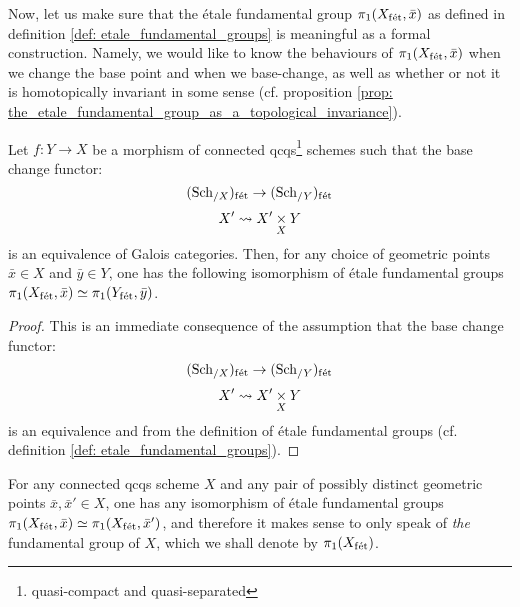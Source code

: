         Now, let us make sure that the \'etale fundamental group $\pi_1(X_{\mathrm{f\acute{e}t}}, \bar{x})$ as defined in definition \ref{def: etale_fundamental_groups} is meaningful as a formal construction. Namely, we would like to know the behaviours of $\pi_1(X_{\mathrm{f\acute{e}t}}, \bar{x})$ when we change the base point and when we base-change, as well as whether or not it is homotopically invariant in some sense (cf. proposition \ref{prop: the_etale_fundamental_group_as_a_topological_invariance}). 
        \begin{proposition} \label{prop: the_etale_fundamental_group_as_a_topological_invariance}
            Let $f: Y \to X$ be a morphism of connected qcqs\footnote{quasi-compact and quasi-separated} schemes such that the base change functor:
                $$(\mathrm{Sch}_{/X})_{\mathrm{f\acute{e}t}} \to (\mathrm{Sch}_{/Y})_{\mathrm{f\acute{e}t}}$$
                $$X' \mapsto X' \x_X Y$$
            is an equivalence of Galois categories. Then, for any choice of geometric points $\bar{x} \in X$ and $\bar{y} \in Y$, one has the following isomorphism of \'etale fundamental groups $\pi_1(X_{\mathrm{f\acute{e}t}}, \bar{x}) \simeq \pi_1(Y_{\mathrm{f\acute{e}t}}, \bar{y})$.
        \end{proposition}
            \begin{proof}
                This is an immediate consequence of the assumption that the base change functor:
                    $$(\mathrm{Sch}_{/X})_{\mathrm{f\acute{e}t}} \to (\mathrm{Sch}_{/Y})_{\mathrm{f\acute{e}t}}$$
                    $$X' \mapsto X' \x_X Y$$
                is an equivalence and from the definition of \'etale fundamental groups (cf. definition \ref{def: etale_fundamental_groups}).
            \end{proof}
        \begin{corollary} \label{coro: etale_fundamental_group_uniqueness}
            For any connected qcqs scheme $X$ and any pair of possibly distinct geometric points $\bar{x}, \bar{x}' \in X$, one has any isomorphism of \'etale fundamental groups $\pi_1(X_{\mathrm{f\acute{e}t}}, \bar{x}) \simeq \pi_1(X_{\mathrm{f\acute{e}t}}, \bar{x}')$, and therefore it makes sense to only speak of \textit{the} fundamental group of $X$, which we shall denote by $\pi_1(X_{\mathrm{f\acute{e}t}})$.
        \end{corollary}
    
